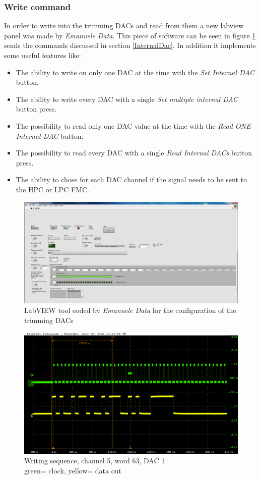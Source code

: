 \subsubsection{Write command}
\noindent In order to write into the trimming DACs and read from them a new labview panel was made by \textit{Emanuele Data}\cite{data}. This piece of software can be seen in figure \ref{fig:labview3} sends the commands discussed in section \ref{InternalDac}. In addition it implements some useful features like:
\begin{itemize}
	\item The ability to write on only one DAC at the time with the \textit{Set Internal DAC} button.
	\item The ability to write every DAC with a single \textit{Set multiple internal DAC} button press.
	\item The possibility to read only one DAC value at the time with the \textit{Read ONE Internal DAC} button.
	\item The possibility to read every DAC with a single \textit{Read Internal DACs} button press.
	\item The ability to chose for each DAC channel if the signal needs to be sent to the HPC or LPC FMC.
\end{itemize}
\begin{figure}[H]
	\centering
	\includegraphics[width=0.99\linewidth]{IMG/ch3/LABVIEW2}
	\caption{LabVIEW tool coded by \textit{Emanuele Data} for the configuration of the trimming DACs}
	\label{fig:labview3}
\end{figure}
\begin{figure}[H]
	\centering
	\includegraphics[width=0.7\linewidth]{IMG/ch5/probe/09-08-2021_ch05-write63-baselinedac1}
	\caption{Writing sequence, channel 5, word 63, DAC 1\\{\color{green}green}= clock, {\color{yellow}yellow}= data out}
	\label{fig:ch05write63}
\end{figure}
